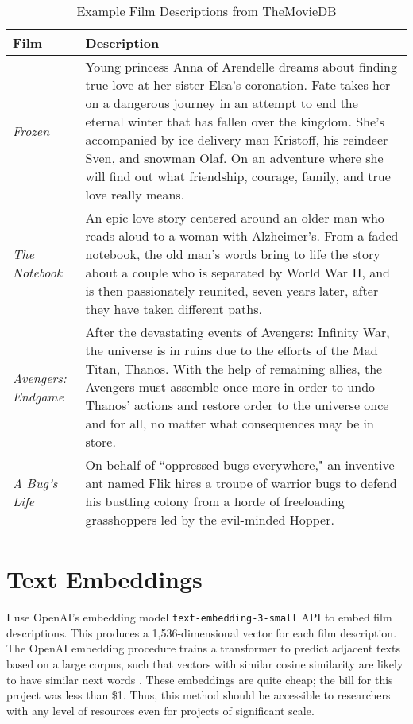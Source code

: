 \documentclass{article}
\begin{document}
\begin{table}
    \begin{tabular}{lp{11cm}}
        \toprule 
        \textbf{Film} & \textbf{Description} \\
        \midrule
        \emph{Frozen} & Young princess Anna of Arendelle dreams about finding true love at her sister Elsa’s coronation. Fate takes her on a dangerous journey in an attempt to end the eternal winter that has fallen over the kingdom. She's accompanied by ice delivery man Kristoff, his reindeer Sven, and snowman Olaf. On an adventure where she will find out what friendship, courage, family, and true love really means. \\
        \emph{The Notebook} & An epic love story centered around an older man who reads aloud to a woman with Alzheimer's. From a faded notebook, the old man's words bring to life the story about a couple who is separated by World War II, and is then passionately reunited, seven years later, after they have taken different paths. \\
        \emph{Avengers: Endgame} & After the devastating events of Avengers: Infinity War, the universe is in ruins due to the efforts of the Mad Titan, Thanos. With the help of remaining allies, the Avengers must assemble once more in order to undo Thanos' actions and restore order to the universe once and for all, no matter what consequences may be in store. \\
        \emph{A Bug's Life} & On behalf of ``oppressed bugs everywhere," an inventive ant named Flik hires a troupe of warrior bugs to defend his bustling colony from a horde of freeloading grasshoppers led by the evil-minded Hopper. \\
        \bottomrule
    \end{tabular} 
    \caption{Example Film Descriptions from TheMovieDB}
    \label{tab:tmdb_desc}
\end{table}

\section{Text Embeddings}

I use OpenAI's embedding model \texttt{text-embedding-3-small} API to embed film descriptions. This produces a 1,536-dimensional vector for each film description. The OpenAI embedding procedure trains a transformer to predict adjacent texts based on a large corpus, such that vectors with similar cosine similarity are likely to have similar next words \parencite{neelakantan2022ao, kusupati2022ao}. These embeddings are quite cheap; the bill for this project was less than \$1. Thus, this method should be accessible to researchers with any level of resources even for projects of significant scale.
\end{document}
